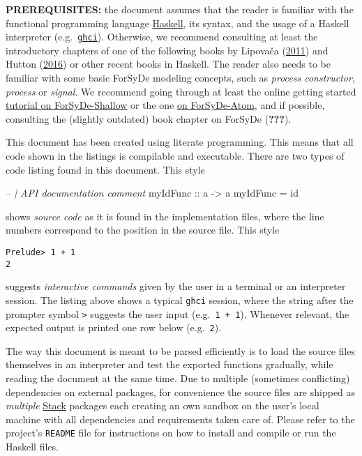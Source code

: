 \documentclass[
  a4paper,
]{article}
\newenvironment{Shaded}{}{}
\newcommand{\CommentTok}[1]{\textcolor[rgb]{0.38,0.63,0.69}{\textit{#1}}}
\newcommand{\FunctionTok}[1]{\textcolor[rgb]{0.02,0.16,0.49}{#1}}
\newcommand{\NormalTok}[1]{#1}
\newcommand{\OtherTok}[1]{\textcolor[rgb]{0.00,0.44,0.13}{#1}}
\begin{document}
\textbf{PREREQUISITES:} the document assumes that the reader is familiar
with the functional programming language
\href{https://www.haskell.org/}{Haskell}, its syntax, and the usage of a
Haskell interpreter
(e.g.~\href{https://downloads.haskell.org/~ghc/latest/docs/html/users_guide/ghci.html}{\texttt{ghci}}).
Otherwise, we recommend consulting at least the introductory chapters of
one of the following books by Lipovača
(\protect\hyperlink{ref-Lipovaca11}{2011}) and Hutton
(\protect\hyperlink{ref-hutton-2016}{2016}) or other recent books in
Haskell. The reader also needs to be familiar with some basic ForSyDe
modeling concepts, such as \emph{process constructor}, \emph{process} or
\emph{signal}. We recommend going through at least the online getting
started
\href{https://forsyde.github.io/forsyde-shallow/getting_started}{tutorial
on ForSyDe-Shallow} or the one
\href{https://forsyde.github.io/forsyde-atom/assets/manual.pdf}{on
ForSyDe-Atom}, and if possible, consulting the (slightly outdated) book
chapter on ForSyDe ({\textbf{???}}).

This document has been created using literate programming. This means
that all code shown in the listings is compilable and executable. There
are two types of code listing found in this document. This style

\begin{Shaded}
\begin{Highlighting}[numbers=left,,]
\CommentTok{-- | API documentation comment}
\OtherTok{myIdFunc ::}\NormalTok{ a }\OtherTok{->}\NormalTok{ a}
\NormalTok{myIdFunc }\FunctionTok{=} \FunctionTok{id}
\end{Highlighting}
\end{Shaded}

shows \emph{source code} as it is found in the implementation files,
where the line numbers correspond to the position in the source file.
This style

\begin{verbatim}
Prelude> 1 + 1
2
\end{verbatim}

suggests \emph{interactive commands} given by the user in a terminal or
an interpreter session. The listing above shows a typical \texttt{ghci}
session, where the string after the prompter symbol
\texttt{\textgreater{}} suggests the user input (e.g.~\texttt{1\ +\ 1}).
Whenever relevant, the expected output is printed one row below
(e.g.~\texttt{2}).

The way this document is meant to be parsed efficiently is to load the
source files themselves in an interpreter and test the exported
functions gradually, while reading the document at the same time. Due to
multiple (sometimes conflicting) dependencies on external packages, for
convenience the source files are shipped as \emph{multiple}
\href{https://docs.haskellstack.org/en/stable/README/}{Stack} packages
each creating an own sandbox on the user's local machine with all
dependencies and requirements taken care of. Please refer to the
project's \texttt{README} file for instructions on how to install and
compile or run the Haskell files.
\end{document}
